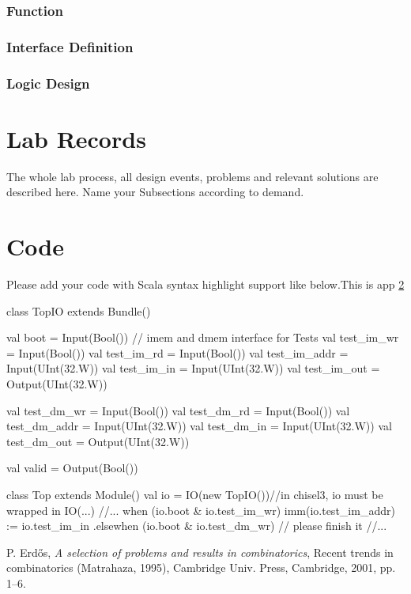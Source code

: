 \documentclass[a4paper]{article}
\begin{document}
\subsubsection{Function}
\subsubsection{Interface Definition}
\subsubsection{Logic Design}


\section{Lab Records}\label{labrec}
The whole lab process, all design events, problems and relevant solutions are described here. Name your Subsections according to demand.

\appendix
\section{Code}\label{sub:app.code}
Please add your code with Scala syntax highlight support like below.This is app \ref{sub:app.code}
\begin{scala}
class TopIO extends Bundle() {
	val boot = Input(Bool()) 
// imem and dmem interface for Tests
	val test_im_wr		= Input(Bool())
	val test_im_rd 		= Input(Bool())
	val test_im_addr 	= Input(UInt(32.W))
	val test_im_in 		= Input(UInt(32.W))
	val test_im_out 	= Output(UInt(32.W))

	val test_dm_wr		= Input(Bool())
	val test_dm_rd 		= Input(Bool())
	val test_dm_addr 	= Input(UInt(32.W))
	val test_dm_in 		= Input(UInt(32.W))
	val test_dm_out 	= Output(UInt(32.W))

	val valid			= Output(Bool())
}
class Top extends Module() {
	val io 		= IO(new TopIO())//in chisel3, io must be wrapped in IO(...) 
	//...
	when (io.boot & io.test_im_wr){
		imm(io.test_im_addr) := io.test_im_in
		} .elsewhen (io.boot & io.test_dm_wr){
		// please finish it
		} //...
}
\end{scala}
\newpage
\begin{thebibliography}{9}
 P. Erd\H os, \emph{A selection of problems and
results in combinatorics}, Recent trends in combinatorics (Matrahaza,
1995), Cambridge Univ. Press, Cambridge, 2001, pp. 1--6.
\end{thebibliography}
\end{document}
